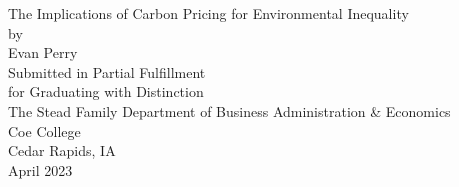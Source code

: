 \documentclass[letterpaper, 11pt]{article}
\newcommand{\1}{\mathds{1}}
\begin{document}

\begin{titlepage}
	\centering
	{\fontsize{14}{14}\selectfont The Implications of Carbon Pricing for Environmental
	Inequality}\\
	\vspace{14em}
	by\\
	Evan Perry\\
	\vspace{10em}
	Submitted in Partial Fulfillment\\
	for Graduating with Distinction\\
	\vspace{6em}
	The Stead Family Department of Business Administration \& Economics\\
	\vspace{9em}
	Coe College\\
	Cedar Rapids, IA\\
	April 2023
\end{titlepage}

\doublespacing



\newpage
\tableofcontents









\newpage





\end{document}
